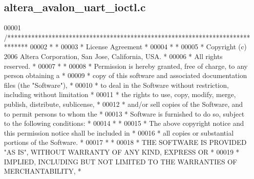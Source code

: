 \subsection{altera\+\_\+avalon\+\_\+uart\+\_\+ioctl.\+c}
\label{altera__avalon__uart__ioctl_8c_source}

\begin{DoxyCode}
00001 \textcolor{comment}{/******************************************************************************}
00002 \textcolor{comment}{*                                                                             *}
00003 \textcolor{comment}{* License Agreement                                                           *}
00004 \textcolor{comment}{*                                                                             *}
00005 \textcolor{comment}{* Copyright (c) 2006 Altera Corporation, San Jose, California, USA.           *}
00006 \textcolor{comment}{* All rights reserved.                                                        *}
00007 \textcolor{comment}{*                                                                             *}
00008 \textcolor{comment}{* Permission is hereby granted, free of charge, to any person obtaining a     *}
00009 \textcolor{comment}{* copy of this software and associated documentation files (the "Software"),  *}
00010 \textcolor{comment}{* to deal in the Software without restriction, including without limitation   *}
00011 \textcolor{comment}{* the rights to use, copy, modify, merge, publish, distribute, sublicense,    *}
00012 \textcolor{comment}{* and/or sell copies of the Software, and to permit persons to whom the       *}
00013 \textcolor{comment}{* Software is furnished to do so, subject to the following conditions:        *}
00014 \textcolor{comment}{*                                                                             *}
00015 \textcolor{comment}{* The above copyright notice and this permission notice shall be included in  *}
00016 \textcolor{comment}{* all copies or substantial portions of the Software.                         *}
00017 \textcolor{comment}{*                                                                             *}
00018 \textcolor{comment}{* THE SOFTWARE IS PROVIDED "AS IS", WITHOUT WARRANTY OF ANY KIND, EXPRESS OR  *}
00019 \textcolor{comment}{* IMPLIED, INCLUDING BUT NOT LIMITED TO THE WARRANTIES OF MERCHANTABILITY,    *}

\end{DoxyCode}
